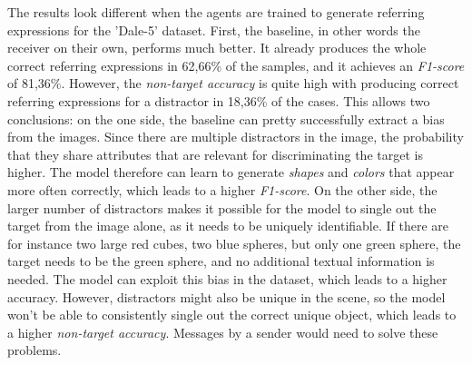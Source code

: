 The results look different when the agents are trained to generate referring expressions for the 'Dale-5' dataset.
First, the baseline, in other words the receiver on their own, performs much better.
It already produces the whole correct referring expressions in 62,66\% of the samples, and it achieves an \emph{F1-score} of 81,36\%.
However, the \emph{non-target accuracy} is quite high with producing correct referring expressions for a distractor in 18,36\% of the cases.
This allows two conclusions: on the one side, the baseline can pretty successfully extract a bias from the images.
Since there are multiple distractors in the image, the probability that they share attributes that are relevant for discriminating the target is higher.
The model therefore can learn to generate \emph{shapes} and \emph{colors} that appear more often correctly, which leads to a higher \emph{F1-score}.
On the other side, the larger number of distractors makes it possible for the model to single out the target from the image alone, as it needs to be uniquely identifiable.
If there are for instance two large red cubes, two blue spheres, but only one green sphere, the target needs to be the green sphere, and no additional textual information is needed.
The model can exploit this bias in the dataset, which leads to a higher accuracy.
However, distractors might also be unique in the scene, so the model won't be able to consistently single out the correct unique object, which leads to a higher \emph{non-target accuracy}.
Messages by a sender would need to solve these problems.

